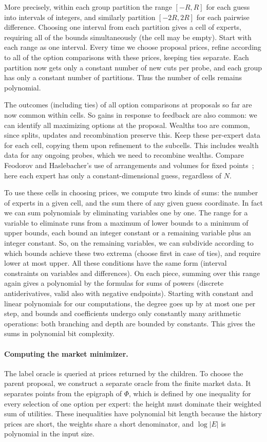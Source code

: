 More precisely, within each group partition
the range \([-R,R]\) for each guess into intervals of integers,
and similarly partition \([-2R,2R]\) for each pairwise difference.
Choosing one interval from each partition gives a cell of experts,
requiring all of the bounds simultaneously
(the cell may be empty). Start with each range as one interval.
Every time we choose proposal prices,
refine according to all of the option comparisons with these
prices, keeping ties separate.
Each partition now gets only a constant number of new cuts per probe,
and each group has only
a constant number of partitions.
Thus the number of cells remains polynomial.

The outcomes (including ties) of all option comparisons at
proposals so far are now common within cells.
So gains in response to feedback are also common:
we can identify all maximizing options at the proposal.
Wealths too are common, since splits, updates and recombination
preserve this.
Keep these per-expert data for each cell,
copying them upon refinement to the subcells.
This includes wealth data for any ongoing probes, which
we need to recombine wealths.
Compare Feodorov and Haslebacher's use of arrangements and volumes
for fixed points~\cite{FH};
here each expert has only a constant-dimensional guess,
regardless of \(N\).

To use these cells in choosing prices, we compute two kinds of sums:
the number of experts in a given cell, and the sum there of any
given guess coordinate.
In fact we can sum polynomials by eliminating variables one by one.
The range for a variable to eliminate runs from a maximum
of lower bounds to a minimum of upper bounds,
each bound an integer constant or a remaining variable plus
an integer constant.
So, on the remaining variables, we can subdivide according to which
bounds achieve these two extrema (choose first in case of ties),
and require lower at most upper.
All these conditions have the same form (interval constraints on
variables and differences). On each piece, summing over this range
again gives a polynomial by the formulas for sums of powers
(discrete antiderivatives, valid also with negative endpoints).
Starting with constant and linear polynomials for our computations,
the degree goes up by at most one per step, and bounds and coefficients
undergo only constantly many arithmetic operations:
both branching and depth are bounded by constants.
This gives the sums in polynomial bit complexity.

\paragraph{Computing the market minimizer.}
The label oracle is queried at prices returned by the children.
To choose the parent proposal, we construct a separate oracle from the
finite market data. It separates points from the epigraph of \(\Phi\),
which is defined by one inequality for every selection of one option
per expert: the height must dominate their weighted sum of utilities.
These inequalities have polynomial bit length because the history
prices are short, the weights share a short denominator, and \(\log|E|\)
is polynomial in the input size.

